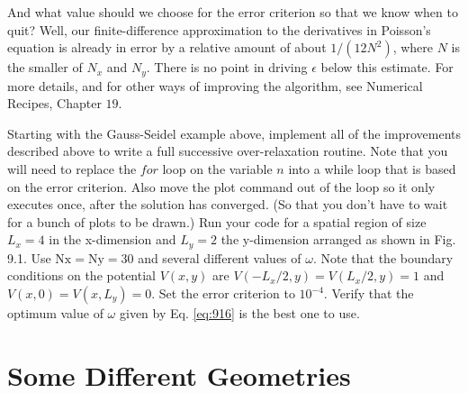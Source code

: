 And what value should we choose for the error criterion so that we know when to quit? Well, our finite-difference approximation to the derivatives in Poisson\rq s equation is already in error by a relative amount of about $1 /\left(12 N^{2}\right)$, where $N$ is the smaller of $N_{x}$ and $N_{y}$. There is no point in driving $\epsilon$ below this estimate. For more details, and for other ways of improving the algorithm, see Numerical Recipes, Chapter $19 .$

\begin{problem}\label{P9.5}
Starting with the Gauss-Seidel example above, implement all of the improvements described above to write a full successive over-relaxation routine. Note that you will need to replace the $for$ loop on the variable $n$ into a while loop that is based on the error criterion. Also move the plot command out of the loop so it only executes once, after the solution has converged. (So that you don\rq t have to wait for a bunch of plots to be drawn.) Run your code for a spatial region of size $L_{x}=4$ in the x-dimension and $L_{y}=2$ the $\mathrm{y}$-dimension arranged as shown in Fig. 9.1. Use $\mathrm{Nx}=\mathrm{Ny}=30$ and several different values of $\omega$. Note that the boundary conditions on the potential $V(x, y)$ are $V\left(-L_{x} / 2, y\right)=V\left(L_{x} / 2, y\right)=1$ and $V(x, 0)=V\left(x, L_{y}\right)=0$. Set the error criterion to $10^{-4}$. Verify that the optimum value of $\omega$ given by Eq. \ref{eq:916} is the best one to use.
\end{problem}

\section*{Some Different Geometries}


